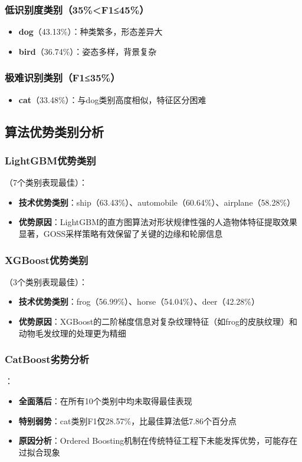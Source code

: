 \documentclass[UTF8]{report}
\theoremstyle{MyLineTheoremStyle} %
\theoremstyle{MyBlockTheoremStyle} %
\theoremstyle{MySubsubsectionStyle} %
\begin{document}
\subsubsection{低识别度类别（35\%<F1≤45\%）}
\begin{itemize}
    \item \textbf{dog}（43.13\%）：种类繁多，形态差异大
    \item \textbf{bird}（36.74\%）：姿态多样，背景复杂
\end{itemize}
\subsubsection{极难识别类别（F1≤35\%）}
\begin{itemize}
    \item \textbf{cat}（33.48\%）：与dog类别高度相似，特征区分困难
\end{itemize}

\subsection{算法优势类别分析}
\subsubsection{LightGBM优势类别}（7个类别表现最佳）：
\begin{itemize}
    \item \textbf{技术优势类别}：ship（63.43\%）、automobile（60.64\%）、airplane（58.28\%）
    \item \textbf{优势原因}：LightGBM的直方图算法对形状规律性强的人造物体特征提取效果显著，GOSS采样策略有效保留了关键的边缘和轮廓信息
\end{itemize}
\subsubsection{XGBoost优势类别}（3个类别表现最佳）：
\begin{itemize}
    \item \textbf{技术优势类别}：frog（56.99\%）、horse（54.04\%）、deer（42.28\%）
    \item \textbf{优势原因}：XGBoost的二阶梯度信息对复杂纹理特征（如frog的皮肤纹理）和动物毛发纹理的处理更为精细
\end{itemize}
\subsubsection{CatBoost劣势分析}：
\begin{itemize}
    \item \textbf{全面落后}：在所有10个类别中均未取得最佳表现
    \item \textbf{特别弱势}：cat类别F1仅28.57\%，比最佳算法低7.86个百分点
    \item \textbf{原因分析}：Ordered Boosting机制在传统特征工程下未能发挥优势，可能存在过拟合现象
\end{itemize}
\end{document}
